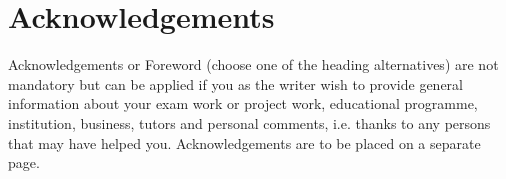 \section*{Acknowledgements}\label{sec:acknowledgements}
{} 
Acknowledgements or Foreword (choose one of the heading alternatives) are not
mandatory but can be applied if you as the writer wish to provide general
information about your exam work or project work, educational programme,
institution, business, tutors and personal comments, i.e. thanks to any persons
that may have helped you. Acknowledgements are to be placed on a separate page.
